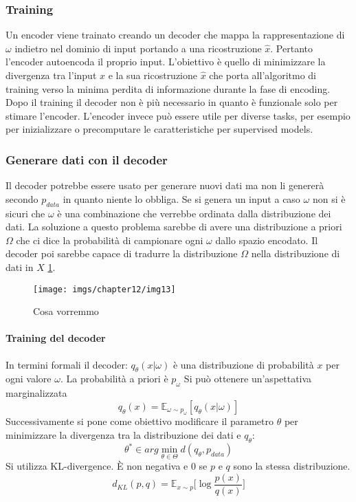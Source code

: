		\subsubsection{Training}
		Un encoder viene trainato creando un decoder che mappa la rappresentazione di $\omega$ indietro nel dominio di input portando a una ricostruzione $\hat{x}$.
		Pertanto l'encoder autoencoda il proprio input.
		L'obiettivo \`e quello di minimizzare la divergenza tra l'input $x$ e la sua ricostruzione $\hat{x}$ che porta all'algoritmo di training verso la minima perdita di informazione durante la fase di encoding.
		Dopo il training il decoder non \`e pi\`u necessario in quanto \`e funzionale solo per stimare l'encoder.
		L'encoder invece pu\`o essere utile per diverse tasks, per esempio per inizializzare o precomputare le caratteristiche per supervised models.
		
		\subsubsection{Generare dati con il decoder}
		Il decoder potrebbe essere usato per generare nuovi dati ma non li generer\`a secondo $p_{data}$ in quanto niente lo obbliga.
		Se si genera un input a caso $\omega$ non si \`e sicuri che $\omega$ \`e una combinazione che verrebbe ordinata dalla distribuzione dei dati.
		La soluzione a questo problema sarebbe di avere una distribuzione a priori $\Omega$ che ci dice la probabilit\`a di campionare ogni $\omega$ dallo spazio encodato.
		Il decoder poi sarebbe capace di tradurre la distribuzione $\Omega$ nella distribuzione di dati in $X$ \ref{fig:chapter12-13}.
		\begin{figure}
			\centering
			\texttt{[image: imgs/chapter12/img13]}
			\caption{Cosa vorremmo}
			\label{fig:chapter12-13}
		\end{figure}
		
		\paragraph{Training del decoder}
		In termini formali il decoder: $q_\theta(x|\omega)$ \`e una distribuzione di probabilit\`a $x$ per ogni valore $\omega$.
		La probabilit\`a a priori \`e $p_\omega$
		Si pu\`o ottenere un'aspettativa marginalizzata
		$$q_\theta(x) = \mathbb{E}_{\omega\sim p_\omega}[q_\theta(x|\omega)]$$
		Successivamente si pone come obiettivo modificare il parametro $\theta$ per minimizzare la divergenza tra la distribuzione dei dati e $q_\theta$:
		$$\theta^*\in arg\min\limits_{\theta\in\Theta}d(q_\theta,p_{data})$$
		Si utilizza KL-divergence.
		\`E non negativa e $0$ se $p$ e $q$ sono la stessa distribuzione.
		$$d_{KL}(p,q) = \mathbb{E}_{x\sim p}\bigl[\log\frac{p(x)}{q(x)}\bigr]$$
		
